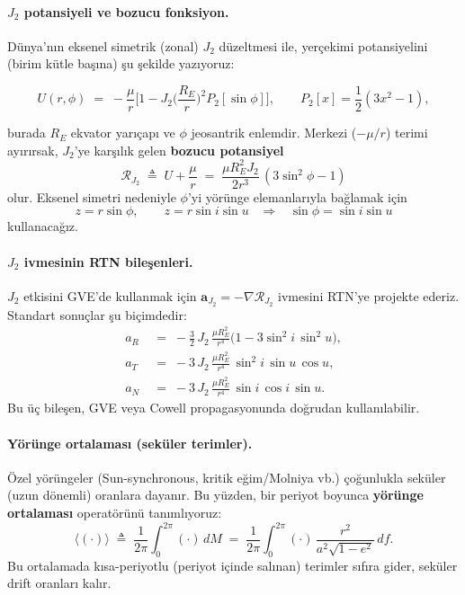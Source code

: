 \paragraph{$J_2$ potansiyeli ve bozucu fonksiyon.}
Dünya’nın eksenel simetrik (zonal) $J_2$ düzeltmesi ile,
yerçekimi potansiyelini (birim kütle başına) şu şekilde yazıyoruz:

\begin{equation}
U(r,\phi) \;=\; -\frac{\mu}{r}\Bigg[1 - J_2\Big(\frac{R_E}{r}\Big)^2 P_2[\sin\phi]\Bigg],
\qquad
P_2[x]=\frac{1}{2}(3x^2-1),
\label{eq:U_J2_def}
\end{equation}

burada $R_E$ ekvator yarıçapı ve $\phi$ jeosantrik enlemdir.
Merkezi ($-\mu/r$) terimi ayırırsak, $J_2$’ye karşılık gelen \textbf{bozucu potansiyel}
\[
\mathcal R_{J_2} \;\triangleq\; U + \frac{\mu}{r}
\;=\; \frac{\mu R_E^2 J_2}{2r^3}\,(3\sin^2\phi - 1)
\]
olur. Eksenel simetri nedeniyle $\phi$’yi yörünge elemanlarıyla bağlamak için
\[
z = r\sin\phi,\qquad
z = r\sin i \sin u
\;\;\;\Rightarrow\;\;\;
\sin\phi = \sin i \sin u
\]
kullanacağız.

\paragraph{$J_2$ ivmesinin RTN bileşenleri.}
$J_2$ etkisini GVE’de kullanmak için $\mathbf a_{J_2} = -\nabla \mathcal R_{J_2}$
ivmesini RTN’ye projekte ederiz. Standart sonuçlar şu biçimdedir:
\begin{subequations}\label{eq:J2_RTN_acc}
\begin{align}
a_R \;&=\; -\frac{3}{2}\,J_2\,\frac{\mu R_E^2}{r^4}\Big(1 - 3\sin^2 i\,\sin^2 u\Big), \label{eq:aR_J2}\\
a_T \;&=\; -3\,J_2\,\frac{\mu R_E^2}{r^4}\,\sin^2 i\,\sin u\,\cos u, \label{eq:aT_J2}\\
a_N \;&=\; -3\,J_2\,\frac{\mu R_E^2}{r^4}\,\sin i\,\cos i\,\sin u. \label{eq:aN_J2}
\end{align}
\end{subequations}
Bu üç bileşen, GVE veya Cowell propagasyonunda doğrudan kullanılabilir.

\paragraph{Yörünge ortalaması (seküler terimler).}
Özel yörüngeler (Sun-synchronous, kritik eğim/Molniya vb.) çoğunlukla seküler (uzun dönemli) oranlara dayanır. Bu yüzden, bir periyot boyunca \textbf{yörünge ortalaması} operatörünü tanımlıyoruz:
\begin{equation}
\big\langle (\cdot)\big\rangle \;\triangleq\;
\frac{1}{2\pi}\int_0^{2\pi} (\cdot)\, dM
\;=\;\frac{1}{2\pi}\int_0^{2\pi} (\cdot)\,\frac{r^2}{a^2\sqrt{1-e^2}}\,df.
\label{eq:orbit_average}
\end{equation}
Bu ortalamada kısa-periyotlu (periyot içinde salınan) terimler sıfıra gider, seküler drift oranları kalır.

